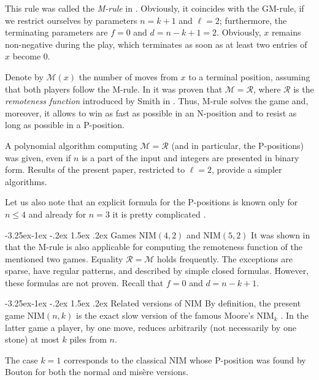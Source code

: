 \documentclass[10pt]{article}
\makeatletter
\renewcommand\subsection{\@startsection{subsection}{2}{\z@}
{-3.25ex\@plus -1ex \@minus -.2ex}
{1.5ex \@plus .2ex}
{\normalfont\normalsize\bfseries\boldmath}}
\theoremstyle{definition}
\def\R{\mathcal{R}}
\def\M{\mathcal{M}}
\makeatother
\begin{document}
This rule was called the {\em M-rule} in \cite{GMMV23}. 
Obviously, it coincides with the GM-rule,  
if we restrict ourselves by parameters  
$n=k+1$  and  $\ell = 2$; 
furthermore, the terminating parameters are
$f=0$  and $d=n-k+1=2$.
Obviously, $x$ remains non-negative 
during the play, which terminates 
as soon as at least two entries of $x$ 
become 0. 

Denote by $\M(x)$  the number of moves 
from  $x$  to a terminal position, 
assuming that both players follow the M-rule. 
In \cite{GMMV23} it was proven that  $\M = \R$, where 
$\R$  is the {\em remoteness function} 
introduced by Smith in \cite{Smi66}. 
Thus, M-rule solves the game and, moreover, 
it allows to win as fast as possible in an N-position and 
to resist as long as possible in a P-position.

A polynomial algorithm computing  $\M = \R$  
(and in particular, the P-positions) was given, 
even if $n$ is a part of the input and 
integers are presented in binary form.
Results of the present paper, restricted to $\ell = 2$, 
provide a simpler algorithms.

Let us also note that 
an explicit formula for the P-positions is known 
only for $n \leq 4$  
and already for $n=3$ it is pretty complicated 
\cite{GHHC20}\cite[Appendix]{GMMV23}.

\subsection{Games NIM$(4,2)$ and NIM$(5,2)$} 
It was shown in \cite{GMN23} 
that the M-rule is also applicable for computing 
the remoteness function of the mentioned two games. 
Equality  $\R = \M$  holds frequently.  
The exceptions are sparse, 
have regular patterns, and described by simple closed formulas.
However, these formulas are not proven. 
Recall that $f=0$ and $d=n-k+1$. 

\subsection{Related versions of NIM} 
By definition, the present game NIM$(n,k)$ 
is the exact slow version  
of the famous Moore's NIM$_k$ \cite{Moo910}.  
In the latter game a player, by one move, 
reduces arbitrarily 
(not necessarily by one stone) 
at most $k$ piles from $n$. 

The case  $k=1$  corresponds to the classical NIM  
whose P-position was found by Bouton 
\cite{Bou901}  for both the normal and mis\`ere versions. 
\end{document}
